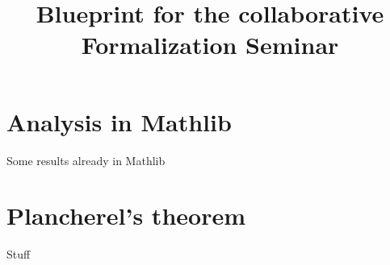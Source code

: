 
\title{Blueprint for the collaborative Formalization Seminar}

\author{}

\maketitle

\tableofcontents

\chapter{Analysis in Mathlib}

Some results already in Mathlib

\chapter{Plancherel's theorem}

Stuff